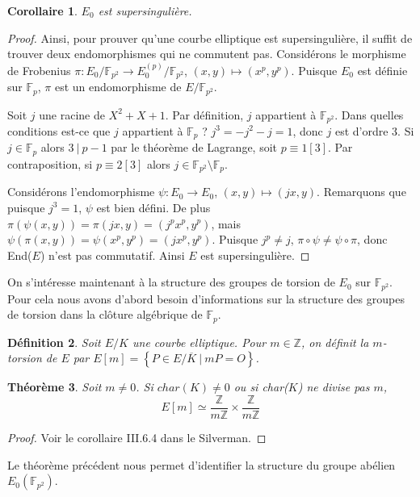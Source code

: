 \documentclass{article}
\theoremstyle{plain}%
\newtheorem{thm}{Théorème}[section]
\newtheorem{deff}[thm]{Définition}
\newtheorem{cor}[thm]{Corollaire}
\theoremstyle{definition}%
\newcommand{\Fp}{\mathbb{F}_{p}}
\newcommand{\Fq}{\mathbb{F}_{p^2}}
\newcommand{\F}{\mathbb{F}}
\newcommand{\Z}{\mathbb{Z}}
\begin{document}
\begin{cor}
  $E_0$ est supersingulière.
\end{cor}

\begin{proof}
Ainsi, pour prouver qu'une courbe elliptique est supersingulière, il suffit de trouver deux endomorphismes qui ne commutent pas.
Considérons le morphisme de Frobenius $\pi : E_0/\Fq \to E_0^{(p)}/\Fq$, $(x, y) \mapsto (x^p, y^p)$. 
Puisque $E_0$ est définie sur $\Fp$, $\pi$ est un endomorphisme de $E/\Fq$.

Soit $j$ une racine de $X^2 + X + 1$. 
Par définition, $j$ appartient à $\Fq$. 
Dans quelles conditions est-ce que $j$ appartient à $\Fp$ ? 
$j^3 = -j^2 -j = 1$, donc $j$ est d'ordre $3$. 
Si $j\in \Fp$ alors $3\ |\ p-1$ par le théorème de Lagrange, soit $p\equiv 1[3]$. 
Par contraposition, si $p \equiv 2 [3]$ alors $j\in\Fq\setminus\Fp$.

Considérons l'endomorphisme $\psi : E_0 \to E_0$, $(x, y) \mapsto (jx, y)$. 
Remarquons que puisque $j^3 = 1$, $\psi$ est bien défini.
De plus $\pi(\psi(x, y)) = \pi(jx, y) = (j^px^p, y^p)$, mais $\psi(\pi(x, y)) = \psi(x^p, y^p) = (jx^p, y^p)$. 
Puisque $j^p\neq j$, $\pi \circ \psi \neq \psi \circ \pi$, donc End($E$) n'est pas commutatif.
Ainsi $E$ est supersingulière.
\end{proof}

On s'intéresse maintenant à la structure des groupes de torsion de $E_0$ sur $\F_{p^2}$. Pour cela nous avons d'abord besoin d'informations sur la structure des groupes de torsion dans la clôture algébrique de $\Fp$.
\begin{deff}
  Soit $E/K$ une courbe elliptique. Pour $m\in\Z$, on définit la $m$-torsion de $E$ par $ E[m] = \left\{ P\in E/\overline{K} \ \vert\  mP = O \right\}$.
\end{deff}

\begin{thm}
  Soit $m\neq0$. Si $char(K)\neq 0$ ou si char($K$) ne divise pas $m$, $$E[m] \simeq \frac{\Z}{m\Z} \times  \frac{\Z}{m\Z}$$
\end{thm}

\begin{proof}
  Voir le corollaire III.6.4 dans le Silverman.
\end{proof}

Le théorème précédent nous permet d'identifier la structure du groupe abélien $E_0(\Fq)$.
\end{document}
